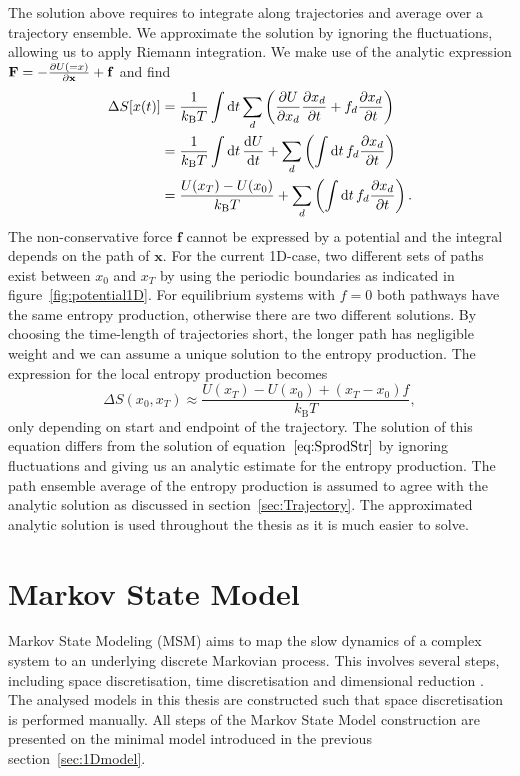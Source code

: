 The solution above requires to integrate along trajectories and average over a trajectory ensemble. We approximate the  solution by ignoring the fluctuations, allowing us to apply Riemann integration. We make use of the analytic expression ${\mathbf{F}} = - \pdv{U({\mathbf ={x}})}{{\mathbf{x}}} + {\mathbf{f}}$ and find
\begin{equation}
\begin{aligned}
\Delta S [x (t)] &= \frac{1}{k_{\mathrm{B}}T} \int \dd {t} \sum_d \left ( \pdv{U}{x_d} \pdv{x_d}{t} + f_d \pdv{x_d}{t} \right )\\
 &= \frac{1}{k_{\mathrm{B}}T} \int \dd {t} \dv{U}{t} + \sum_d \left ( \int \dd {t} f_d \pdv{x_d}{t} \right )\\
 &=\frac{U(x_T) - U(x_0)  }{k_{\mathrm{B}}T} +  \sum_d \left ( \int \dd {t} f_d \pdv{x_d}{t} \right ) . 
\end{aligned}
\end{equation}
The non-conservative force $\mathbf{f}$ cannot be expressed by a potential and the integral depends on the path of $\mathbf{x}$. For the current 1D-case, two different sets of paths exist between $x_0$ and $x_T$ by using  the periodic boundaries as indicated in figure~\ref{fig:potential1D}. For equilibrium systems with $f=0$ both pathways have the same entropy production, otherwise there are two different solutions. By choosing the time-length of trajectories short, the longer path has negligible weight and we can assume a unique solution to the entropy production. The expression for the local entropy production becomes
\begin{equation}
  \Delta S(x_0,x_T) \approx \frac{ U(x_T) - U(x_0) + (x_T -x_0) f  }{ 
 k_{\mathrm{B}}T },
 \label{eq:Sprodth}
\end{equation}
only depending on start and endpoint of the trajectory. The solution of this equation differs from the solution of equation~$\ref{eq:SprodStr}$ by ignoring fluctuations and giving us an analytic estimate for the entropy production.  The path ensemble average of the entropy production is assumed to agree with the analytic solution as discussed in section~\ref{sec:Trajectory}. The approximated analytic solution is used throughout the thesis as it is much easier to solve. 



  
\section{Markov State Model}
\label{sec:MSM}
Markov State Modeling (MSM) aims to map the slow dynamics of a complex system to an underlying discrete Markovian process.
This involves several steps, including space discretisation, time discretisation and dimensional reduction \cite{bowman2013introduction}. The analysed models in this thesis are constructed such that space discretisation is performed manually.  All steps of the Markov State Model construction are presented on the minimal model introduced in the previous section~\ref{sec:1Dmodel}.

